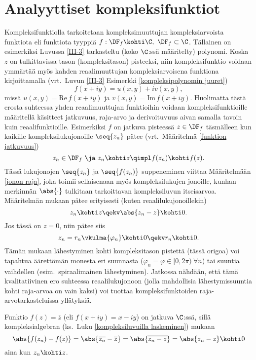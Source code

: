\section{Analyyttiset kompleksifunktiot} \label{analyyttiset funktiot}
\alku {}

Kompleksifunktiolla tarkoitetaan kompleksimuuttujan kompleksiarvoista funktiota eli
funktiota tyyppiä $f: \DF_f\kohti\C,\ \DF_f\subset\C$. Tällainen on esimerkiksi Luvussa
\ref{III-3} tarkasteltu (koko $\C$:ssä määritelty) polynomi. Koska $z$ on
tulkittavissa tason (kompleksitason) pisteeksi, niin kompleksifunktio voidaan ymmärtää
myös kahden reaalimuuttujan kompleksiarvoisena funktiona kirjoittamalla (vrt.\ Luvun
\ref{III-3} Esimerkki \ref{kompleksipolynomin juuret})
\[
f(x+iy) = u(x,y)+iv(x,y),
\]
missä $u(x,y)=\text{Re}\,f(x+iy)$ ja $v(x,y)=\text{Im}\,f(x+iy)$. Huolimatta tästä erosta
suhteessa yhden reaalimuuttujan funktioihin voidaan kompleksifunktioille määritellä käsitteet
jatkuvuus, raja-arvo ja derivoituvuus aivan samalla tavoin kuin reaalifunktioille. Esimerkiksi
$f$ on jatkuva pisteessä $z\in\DF_f$ täsmälleen kun kaikille kompleksilukujonoille $\seq{z_n}$
pätee (vrt.\ Määritelmä \ref{funktion jatkuvuus})
\[ 
z_n\in\DF_f\ \ja\ z_n \kohti z \qimpl f(z_n) \kohti f(z).
\]
Tässä lukujonojen $\seq{z_n}$ ja $\seq{f(z_n)}$ suppeneminen viittaa Määritelmään
\ref{jonon raja}, joka toimii sellaisenaan myös kompleksilukujen jonoille, kunhan merkinnän
$\abs{\cdot}$ tulkitaan tarkoittavan kompleksiluvun itseisarvoa. Määritelmän mukaan pätee
erityisesti (kuten reaalilukujonoillekin)
\[ 
z_n \kohti z \qekv \abs{z_n - z} \kohti 0.
\]
Jos tässä on $z=0$, niin pätee siis
\[
z_n=r_n\vkulma{\varphi_n} \kohti 0 \qekv r_n \kohti 0.
\]
Tämän mukaan lähestyminen kohti kompleksitason pistettä (tässä origoa) voi tapahtua
äärettömän monesta eri suunnasta ($\varphi_n=\varphi\in[0,2\pi)\ \forall n$) tai suuntia
vaihdellen (esim.\ spiraalimainen lähestyminen). Jatkossa nähdään, että tämä kvalitatiivinen
ero suhteessa reaalilukujonoon (jolla mahdollisia lähestymissuuntia kohti raja-arvoa on vain
kaksi) voi tuottaa kompleksifunktoiden raja-arvotarkasteluissa yllätyksiä.
\begin{Exa} Funktio $f(z)=\overline{z}$ (eli $f(x+iy)=x-iy$) on jatkuva $\C$:ssä, sillä
kompleksialgebran (ks.\ Luku \ref{kompleksiluvuilla laskeminen}) mukaan
\[
\abs{f(z_n)-f(z)} = \abs{\overline{z_n}-\overline{z}} 
                  = \abs{\overline{z_n-z}} = \abs{z_n-z} \kohti 0
\]
aina kun $z_n \kohti z$. \loppu
\end{Exa}
